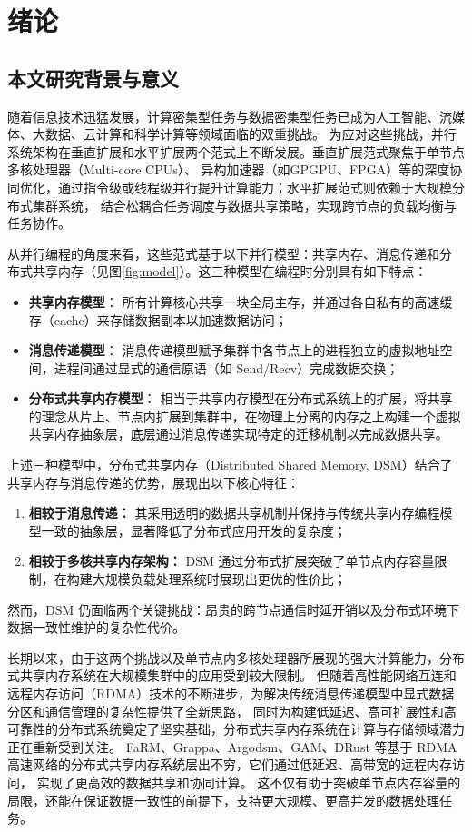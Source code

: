 \chapter{绪论}\label{chap:introduction}{
  \section{本文研究背景与意义}
  随着信息技术迅猛发展，计算密集型任务与数据密集型任务已成为人工智能、流媒体、大数据、云计算和科学计算等领域面临的双重挑战。
  为应对这些挑战，并行系统架构在垂直扩展和水平扩展两个范式上不断发展。垂直扩展范式聚焦于单节点多核处理器（Multi-core CPUs）、
  异构加速器（如GPGPU、FPGA）等的深度协同优化，通过指令级或线程级并行提升计算能力；水平扩展范式则依赖于大规模分布式集群系统，
  结合松耦合任务调度与数据共享策略，实现跨节点的负载均衡与任务协作。

  从并行编程的角度来看，这些范式基于以下并行模型：共享内存、消息传递和分
  布式共享内存（见图\ref{fig:model}）。这三种模型在编程时分别具有如下特点：
  \begin{itemize}
    \item \textbf{共享内存模型}： 所有计算核心共享一块全局主存，并通过各自私有的高速缓存（cache）来存储数据副本以加速数据访问；
    \item \textbf{消息传递模型}： 消息传递模型赋予集群中各节点上的进程独立的虚拟地址空间，进程间通过显式的通信原语（如 Send/Recv）完成数据交换；
    \item \textbf{分布式共享内存模型}： 相当于共享内存模型在分布式系统上的扩展，将共享的理念从片上、节点内扩展到集群中，在物理上分离的内存之上构建一个虚拟共享内存抽象层，底层通过消息传递实现特定的迁移机制以完成数据共享。
  \end{itemize}

  上述三种模型中，分布式共享内存（Distributed Shared Memory, DSM）结合了共享内存与消息传递的优势，展现出以下核心特征：
  \begin{enumerate}[leftmargin=1em, align=left]
    \item \textbf{相较于消息传递：} 其采用透明的数据共享机制并保持与传统共享内存编程模型一致的抽象层，显著降低了分布式应用开发的复杂度；
    \item \textbf{相较于多核共享内存架构：} DSM 通过分布式扩展突破了单节点内存容量限制，在构建大规模负载处理系统时展现出更优的性价比；
  \end{enumerate}

  然而，DSM 仍面临两个关键挑战：昂贵的跨节点通信时延开销以及分布式环境下数据一致性维护的复杂性代价。

  长期以来，由于这两个挑战以及单节点内多核处理器所展现的强大计算能力，分布式共享内存系统在大规模集群中的应用受到较大限制。
  但随着高性能网络互连和远程内存访问（RDMA）技术的不断进步，为解决传统消息传递模型中显式数据分区和通信管理的复杂性提供了全新思路，
  同时为构建低延迟、高可扩展性和高可靠性的分布式系统奠定了坚实基础，分布式共享内存系统在计算与存储领域潜力正在重新受到关注。
  FaRM、Grappa、Argodsm、GAM、DRust 等基于 RDMA 高速网络的分布式共享内存系统层出不穷，它们通过低延迟、高带宽的远程内存访问，
  实现了更高效的数据共享和协同计算。
  这不仅有助于突破单节点内存容量的局限，还能在保证数据一致性的前提下，支持更大规模、更高并发的数据处理任务。

}
